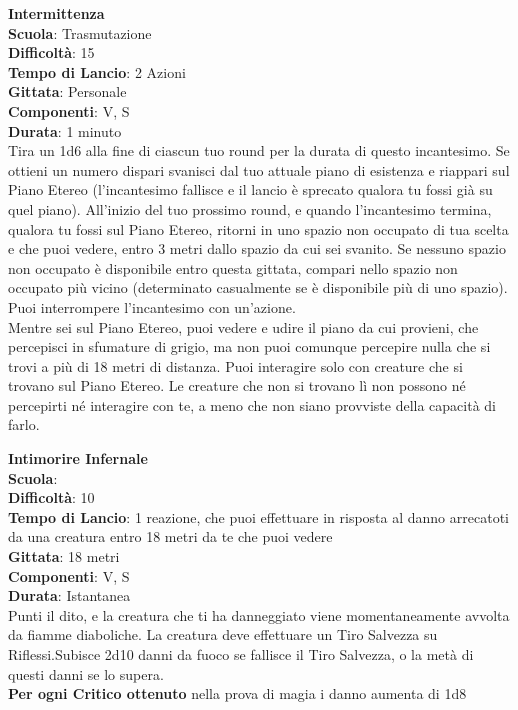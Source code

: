 \begin{multicols}{2}
\medskip\textbf{Intermittenza}\\
\textbf{Scuola}: Trasmutazione\\
\textbf{Difficoltà}:  15\\
\textbf{Tempo di Lancio}: 2 Azioni\\
\textbf{Gittata}: Personale\\
\textbf{Componenti}: V, S\\
\textbf{Durata}: 1 minuto\\
Tira un 1d6 alla fine di ciascun tuo round per la durata di questo incantesimo. Se ottieni un numero dispari svanisci dal tuo attuale piano di esistenza e riappari sul Piano Etereo (l'incantesimo fallisce e il lancio è sprecato qualora tu fossi già su quel piano). All'inizio del tuo prossimo round, e quando l'incantesimo termina, qualora tu fossi sul Piano Etereo, ritorni in uno spazio non occupato di tua scelta e che puoi vedere, entro 3 metri dallo spazio da cui sei svanito. Se nessuno spazio non occupato è disponibile entro questa gittata, compari nello spazio non occupato più vicino (determinato casualmente se è disponibile più di uno spazio). Puoi interrompere l'incantesimo con un'azione.\\
Mentre sei sul Piano Etereo, puoi vedere e udire il piano da cui provieni, che percepisci in sfumature di grigio, ma non puoi comunque percepire nulla che si trovi a più di 18 metri di distanza. Puoi interagire solo con creature che si trovano sul Piano Etereo. Le creature che non si trovano lì non possono né percepirti né interagire con te, a meno che non siano provviste della capacità di farlo.

\medskip\textbf{Intimorire Infernale}\\
\textbf{Scuola}: \\
\textbf{Difficoltà}:  10\\
\textbf{Tempo di Lancio}: 1 reazione, che puoi effettuare in risposta al danno arrecatoti da una creatura entro 18 metri da te che puoi vedere\\
\textbf{Gittata}: 18 metri\\
\textbf{Componenti}: V, S\\
\textbf{Durata}: Istantanea\\
Punti il dito, e la creatura che ti ha danneggiato viene momentaneamente avvolta da fiamme diaboliche. La creatura deve effettuare un Tiro Salvezza su Riflessi.Subisce 2d10 danni da fuoco se  fallisce il Tiro Salvezza, o la metà di questi danni se lo supera.\\
\textbf{Per ogni Critico ottenuto} nella prova di magia i danno aumenta di 1d8


\end{multicols}
